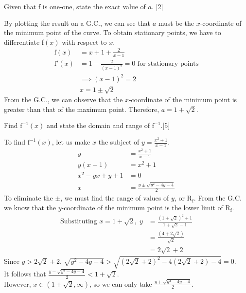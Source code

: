 \documentclass[12pt, a4 paper]{article}
\begin{document}
\begin{outline}[enumerate]
 \2 Given that f is one-one, state the exact value of $a$. \hfill[2]
 \begin{answer}
  By plotting the result on a G.C., we can see that $a$ must be the $x$-coordinate of the minimum point of the curve. To obtain stationary points, we have to differentiate \textrm{f}$(x)$ with respect to $x$.
  \begin{align*}
   \textrm{f}(x)  & =x+1+\frac{2}{x-1}                                       \\
   \textrm{f}'(x) & =1-\frac{2}{(x-1)^2}=0 \textrm{   for stationary points} \\
                  & \implies (x-1)^2=2                                       \\
                  & x=1\pm \sqrt{2}
  \end{align*}
  From the G.C., we can observe that the $x$-coordinate of the minimum point is greater than that of the maximum point. Therefore, $a=1+\sqrt{2}$.
 \end{answer}
 \2 Find $\textrm{f}^{-1}(x)$ and state the domain and range of $\textrm{f}^{-1}$.\hfill[5]
 \begin{answer}
  To find $\textrm{f}^{-1}(x)$, let us make $x$ the subject of $y=\frac{x^2+1}{x-1}$.
  \begin{align*}
   y          & =\frac{x^2+1}{x-1}               \\
   y(x-1)     & =x^2+1                           \\
   x^2-yx+y+1 & =0                               \\
   x          & = \frac{y\pm \sqrt{y^2-4y-4}}{2}
  \end{align*}
  To eliminate the $\pm$, we must find the range of values of $y$, or $\textrm{R}_{\textrm{f}}$. From the G.C. we know that the $y$-coordinate of the minimum point is the lower limit of $\textrm{R}_{\textrm{f}}$.
  \begin{align*}
   \textrm{Substituting }x=1+\sqrt{2},\; y & =\frac{(1+\sqrt{2})^2+1}{1+\sqrt{2}-1} \\
                                           & = \frac{(4+2\sqrt{2})}{\sqrt{2}}       \\
                                           & = 2\sqrt{2}+2
  \end{align*}
  Since $y>2\sqrt{2}+2$, $\sqrt{y^2-4y-4}>\sqrt{(2\sqrt{2}+2)^2-4(2\sqrt{2}+2)-4}=0$.\\
  It follows that $\frac{y-\sqrt{y^2-4y-4}}{2}<1+\sqrt{2}$.\\
  However, $x \in (1+\sqrt{2},\infty)$, so we can only take $\frac{y+\sqrt{y^2-4y-4}}{2}$.\\

\end{answer}
\end{outline}
\end{document}
